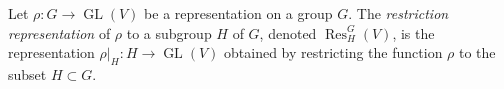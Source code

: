 \documentclass{article}
\newcommand{\GL}{\operatorname{GL}}
\begin{document}
Let $\rho: G \longrightarrow \GL(V)$ be a representation on a group $G$. The {\em restriction representation} of $\rho$ to a subgroup $H$ of $G$, denoted $\operatorname{Res}^G_H(V)$, is the representation $\rho|_H: H \longrightarrow \GL(V)$ obtained by restricting the function $\rho$ to the subset $H \subset G$.
\end{document}
